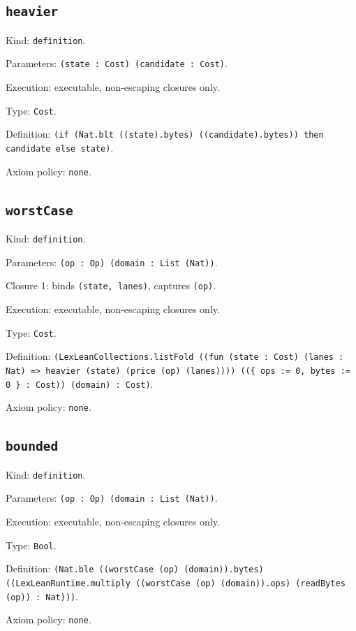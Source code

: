 \documentclass[11pt]{article}
\begin{document}
\subsection*{\texttt{heavier}}
\noindent Kind: \texttt{definition}.\par
\noindent Parameters: \texttt{(state : Cost) (candidate : Cost)}.\par
\noindent Execution: executable, non-escaping closures only.\par
\noindent Type: \texttt{Cost}.\par
\noindent Definition: \texttt{(if (Nat.blt ((state).bytes) ((candidate).bytes)) then candidate else state)}.\par
\noindent Axiom policy: \texttt{none}.\par
\subsection*{\texttt{worstCase}}
\noindent Kind: \texttt{definition}.\par
\noindent Parameters: \texttt{(op : Op) (domain : List (Nat))}.\par
\noindent Closure 1: binds \texttt{(state, lanes)}, captures \texttt{(op)}.\par
\noindent Execution: executable, non-escaping closures only.\par
\noindent Type: \texttt{Cost}.\par
\noindent Definition: \texttt{(LexLeanCollections.listFold ((fun (state : Cost) (lanes : Nat) => heavier (state) (price (op) (lanes)))) ((\{ ops := 0, bytes := 0 \} : Cost)) (domain) : Cost)}.\par
\noindent Axiom policy: \texttt{none}.\par
\subsection*{\texttt{bounded}}
\noindent Kind: \texttt{definition}.\par
\noindent Parameters: \texttt{(op : Op) (domain : List (Nat))}.\par
\noindent Execution: executable, non-escaping closures only.\par
\noindent Type: \texttt{Bool}.\par
\noindent Definition: \texttt{(Nat.ble ((worstCase (op) (domain)).bytes) ((LexLeanRuntime.multiply ((worstCase (op) (domain)).ops) (readBytes (op)) : Nat)))}.\par
\noindent Axiom policy: \texttt{none}.\par
\end{document}
